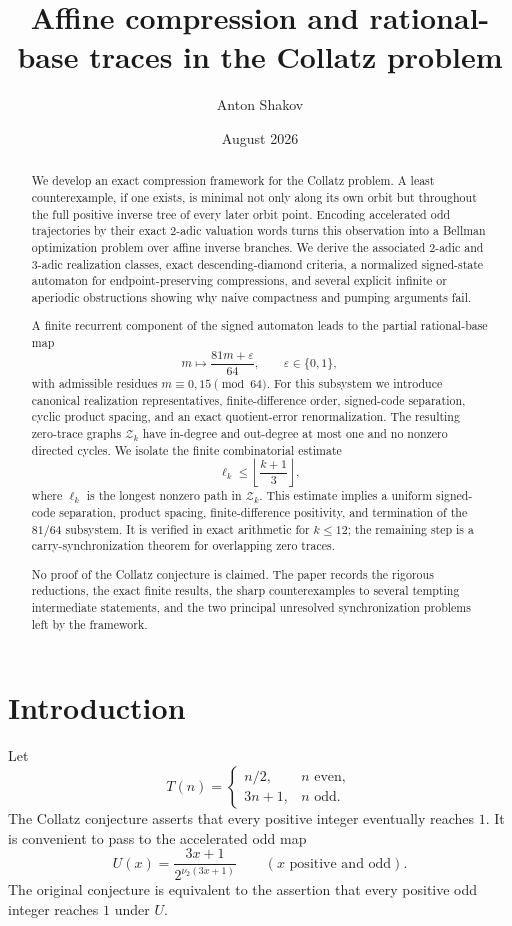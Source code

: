 \documentclass[11pt,reqno]{amsart}
\title[Compression and rational-base traces]{Affine compression and rational-base traces in the Collatz problem}
\author{Anton Shakov}
\date{August 2026}
\numberwithin{equation}{section}
\theoremstyle{definition}
\theoremstyle{remark}
\newcommand{\vtwo}{\nu_2}
\newcommand{\eps}{\varepsilon}
\begin{document}
\begin{abstract}
We develop an exact compression framework for the Collatz problem.  A least counterexample, if one exists, is minimal not only along its own orbit but throughout the full positive inverse tree of every later orbit point.  Encoding accelerated odd trajectories by their exact $2$-adic valuation words turns this observation into a Bellman optimization problem over affine inverse branches.  We derive the associated $2$-adic and $3$-adic realization classes, exact descending-diamond criteria, a normalized signed-state automaton for endpoint-preserving compressions, and several explicit infinite or aperiodic obstructions showing why naive compactness and pumping arguments fail.

A finite recurrent component of the signed automaton leads to the partial rational-base map
\[
 m\longmapsto \frac{81m+\eps}{64},\qquad \eps\in\{0,1\},
\]
with admissible residues $m\equiv0,15\pmod{64}$.  For this subsystem we introduce canonical realization representatives, finite-difference order, signed-code separation, cyclic product spacing, and an exact quotient-error renormalization.  The resulting zero-trace graphs $\mathcal Z_k$ have in-degree and out-degree at most one and no nonzero directed cycles.  We isolate the finite combinatorial estimate
\[
 \ell_k\le \left\lfloor\frac{k+1}{3}\right\rfloor,
\]
where $\ell_k$ is the longest nonzero path in $\mathcal Z_k$.  This estimate implies a uniform signed-code separation, product spacing, finite-difference positivity, and termination of the $81/64$ subsystem.  It is verified in exact arithmetic for $k\le12$; the remaining step is a carry-synchronization theorem for overlapping zero traces.

No proof of the Collatz conjecture is claimed.  The paper records the rigorous reductions, the exact finite results, the sharp counterexamples to several tempting intermediate statements, and the two principal unresolved synchronization problems left by the framework.
\end{abstract}

\maketitle
\tableofcontents

\section{Introduction}

Let
\[
T(n)=\begin{cases}
n/2,&n\text{ even},\\
3n+1,&n\text{ odd}.
\end{cases}
\]
The Collatz conjecture asserts that every positive integer eventually reaches $1$.  It is convenient to pass to the accelerated odd map
\begin{equation}\label{eq:Udef}
 U(x)=\frac{3x+1}{2^{\vtwo(3x+1)}}
 \qquad(x\text{ positive and odd}).
\end{equation}
The original conjecture is equivalent to the assertion that every positive odd integer reaches $1$ under $U$.
\end{document}
